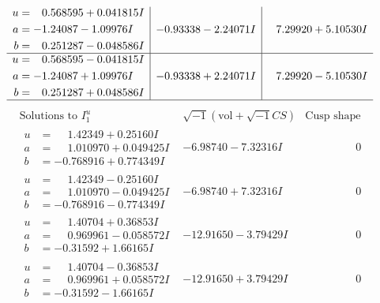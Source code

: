 \documentclass[1p]{elsarticle_modified}
\theoremstyle{definition}
\newcommand{\I}{\sqrt{-1}}
\begin{document}
$$\begin{array}{c|c|c}
\begin{aligned}
u &= \phantom{-}0.568595 + 0.041815 I \\
a &= -1.24087 - 1.09976 I \\
b &= \phantom{-}0.251287 - 0.048586 I\end{aligned}
 & -0.93338 - 2.24071 I & \phantom{-}7.29920 + 5.10530 I \\ \hline\begin{aligned}
u &= \phantom{-}0.568595 - 0.041815 I \\
a &= -1.24087 + 1.09976 I \\
b &= \phantom{-}0.251287 + 0.048586 I\end{aligned}
 & -0.93338 + 2.24071 I & \phantom{-}7.29920 - 5.10530 I\\
 \hline 
 \end{array}$$\newpage$$\begin{array}{c|c|c}  
\text{Solutions to }I^u_{1}& \I (\text{vol} + \sqrt{-1}CS) & \text{Cusp shape}\\
 \hline 
\begin{aligned}
u &= \phantom{-}1.42349 + 0.25160 I \\
a &= \phantom{-}1.010970 + 0.049425 I \\
b &= -0.768916 + 0.774349 I\end{aligned}
 & -6.98740 - 7.32316 I & \phantom{-0.000000 } 0 \\ \hline\begin{aligned}
u &= \phantom{-}1.42349 - 0.25160 I \\
a &= \phantom{-}1.010970 - 0.049425 I \\
b &= -0.768916 - 0.774349 I\end{aligned}
 & -6.98740 + 7.32316 I & \phantom{-0.000000 } 0 \\ \hline\begin{aligned}
u &= \phantom{-}1.40704 + 0.36853 I \\
a &= \phantom{-}0.969961 - 0.058572 I \\
b &= -0.31592 + 1.66165 I\end{aligned}
 & -12.91650 - 3.79429 I & \phantom{-0.000000 } 0 \\ \hline\begin{aligned}
u &= \phantom{-}1.40704 - 0.36853 I \\
a &= \phantom{-}0.969961 + 0.058572 I \\
b &= -0.31592 - 1.66165 I\end{aligned}
 & -12.91650 + 3.79429 I & \phantom{-0.000000 } 0 \\ \hline\begin{aligned}

\end{aligned}
\end{array}$$
\end{document}
